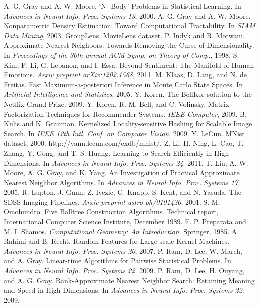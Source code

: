 \documentclass[twocolumn,a4paper]{article}
\begin{document}
\begin{thebibliography}{1}
 A. G. Gray and A. W. Moore. ‘N -Body’ Problems in Statistical Learning. In \emph{Advances in Neural Info. Proc. Systems 13}, 2000.
 A. G. Gray and A. W. Moore. Nonparametric Density Estimation: Toward Computational Tractability. In \emph{SIAM Data Mining}, 2003.
 GroupLens. MovieLens dataset.
 P. Indyk and R. Motwani. Approximate Nearest Neighbors: Towards Removing the Curse of Dimensionality. In \emph{Proceedings of the 30th annual ACM Symp. on Theory of Comp.}, 1998.
 S. Kim, F. Li, G. Lebanon, and I. Essa. Beyond Sentiment: The Manifold of Human Emotions. \emph{Arxiv preprint arXiv:1202.1568}, 2011.
 M. Klaas, D. Lang, and N. de Freitas. Fast Maximum-a-posteriori Inference in Monte Carlo State Spaces. In \emph{Artificial Intelligence and Statistics}, 2005.
 Y. Koren. The BellKor solution to the Netflix Grand Prize. 2009.
 Y. Koren, R. M. Bell, and C. Volinsky. Matrix Factorization Techniques for Recommender Systems. \emph{IEEE Computer}, 2009.
 B. Kulis and K. Grauman. Kernelized Locality-sensitive Hashing for Scalable Image Search.  In \emph{IEEE 12th Intl. Conf. on Computer Vision}, 2009.
 Y. LeCun. MNist dataset, 2000. http://yann.lecun.com/exdb/mnist/.
 Z. Li, H. Ning, L. Cao, T. Zhang, Y. Gong, and T. S. Huang. Learning to Search Efficiently in High Dimensions. In \emph{Advances in Neural Info. Proc. Systems 24}. 2011.
 T. Liu, A. W. Moore, A. G. Gray, and K. Yang. An Investigation of Practical Approximate Nearest Neighbor Algorithms. In \emph{Advances in Neural Info. Proc. Systems 17}, 2005.
 R. Lupton, J. Gunn, Z. Ivezic, G. Knapp, S. Kent, and N. Yasuda. The SDSS Imaging Pipelines. \emph{Arxiv preprint astro-ph/0101420}, 2001.
 S. M. Omohundro. Five Balltree Construction Algorithms. Technical report, International Computer Science Institute, December 1989.
 F. P. Preparata and M. I. Shamos. \emph{Computational Geometry: An Introduction}. Springer, 1985.
 A. Rahimi and B. Recht. Random Features for Large-scale Kernel Machines. \emph{Advances in Neural Info. Proc. Systems 20}, 2007.
 P. Ram, D. Lee, W. March, and A. Gray. Linear-time Algorithms for Pairwise Statistical Problems. In \emph{Advances in Neural Info. Proc. Systems 22}. 2009.
 P. Ram, D. Lee, H. Ouyang, and A. G. Gray. Rank-Approximate Nearest Neighbor Search: Retaining Meaning and Speed in High Dimensions. In \emph{Advances in Neural Info. Proc. Systems 22}. 2009.
\end{thebibliography}
\end{document}
